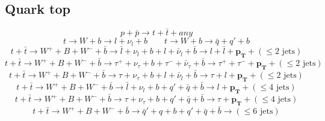 \documentclass[10pt, onecolumn, a4paper]{article}
\def\bb{\mathbf}
\def\({\left(}
\def\){\right)}
\begin{document}
\subsection{Quark top} %
$$p+\bar p\to t+\bar t+ any$$
$$t\to W+b\to l+\nu_l+b \qquad t\to W+b\to\bar q+q'+b$$
$$t+\bar t\to W^++B+W^-+\bar b\to \bar l +\nu_l+b+l+\bar\nu_l+\bar b\to l+\bar l+\bb{p_T}+ \(\le2 \textrm{ jets}\)$$
$$t+\bar t\to W^++B+W^-+\bar b\to \tau^++\nu_\tau+b+\tau^-+\bar\nu_\tau+\bar b \to \tau^++\tau^-+\bb{p_T}+ \(\le2 \textrm{ jets}\)$$
$$t+\bar t\to W^++B+W^-+\bar b\to \tau+\nu_\tau+b+l+\bar\nu_l+\bar b\to \tau+l+\bb{p_T}+ \(\le2 \textrm{ jets}\)$$
$$t+\bar t\to W^++B+W^-+\bar b\to \bar l+\nu_l+b+q'+\bar q+\bar b\to l+\bb{p_T}+ \(\le4 \textrm{ jets}\)$$
$$t+\bar t\to W^++B+W^-+\bar b\to \tau+\nu_\tau+b+q'+\bar q+\bar b\to \tau+\bb{p_T}+ \(\le4 \textrm{ jets}\)$$
$$t+\bar t\to W^++B+W^-+\bar b\to \bar q'+q+b+q'+\bar q+\bar b\to \(\le6 \textrm{ jets}\)$$
\end{document}
